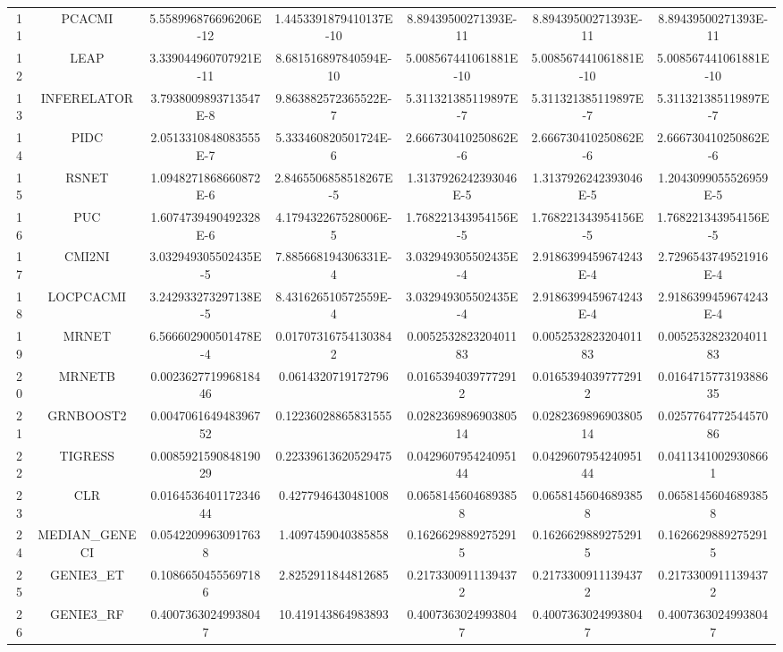 \documentclass[a4paper,10pt]{article}
\begin{document}
\begin{landscape}
\begin{table}[!htp]
\begin{tabular}{ccccccc}
11&PCACMI&5.558996876696206E-12&1.4453391879410137E-10&8.89439500271393E-11&8.89439500271393E-11&8.89439500271393E-11\\
12&LEAP&3.339044960707921E-11&8.681516897840594E-10&5.008567441061881E-10&5.008567441061881E-10&5.008567441061881E-10\\
13&INFERELATOR&3.7938009893713547E-8&9.863882572365522E-7&5.311321385119897E-7&5.311321385119897E-7&5.311321385119897E-7\\
14&PIDC&2.0513310848083555E-7&5.333460820501724E-6&2.666730410250862E-6&2.666730410250862E-6&2.666730410250862E-6\\
15&RSNET&1.0948271868660872E-6&2.8465506858518267E-5&1.3137926242393046E-5&1.3137926242393046E-5&1.2043099055526959E-5\\
16&PUC&1.6074739490492328E-6&4.179432267528006E-5&1.768221343954156E-5&1.768221343954156E-5&1.768221343954156E-5\\
17&CMI2NI&3.032949305502435E-5&7.885668194306331E-4&3.032949305502435E-4&2.9186399459674243E-4&2.7296543749521916E-4\\
18&LOCPCACMI&3.242933273297138E-5&8.431626510572559E-4&3.032949305502435E-4&2.9186399459674243E-4&2.9186399459674243E-4\\
19&MRNET&6.566602900501478E-4&0.017073167541303842&0.005253282320401183&0.005253282320401183&0.005253282320401183\\
20&MRNETB&0.002362771996818446&0.0614320719172796&0.01653940397772912&0.01653940397772912&0.016471577319388635\\
21&GRNBOOST2&0.004706164948396752&0.12236028865831555&0.028236989690380514&0.028236989690380514&0.025776477254457086\\
22&TIGRESS&0.008592159084819029&0.22339613620529475&0.042960795424095144&0.042960795424095144&0.04113410029308661\\
23&CLR&0.016453640117234644&0.4277946430481008&0.06581456046893858&0.06581456046893858&0.06581456046893858\\
24&MEDIAN_GENECI&0.05422099630917638&1.4097459040385858&0.16266298892752915&0.16266298892752915&0.16266298892752915\\
25&GENIE3_ET&0.10866504555697186&2.8252911844812685&0.21733009111394372&0.21733009111394372&0.21733009111394372\\
26&GENIE3_RF&0.40073630249938047&10.419143864983893&0.40073630249938047&0.40073630249938047&0.40073630249938047\\
\hline
\end{tabular}
\end{table}


\end{landscape}
\end{document}
